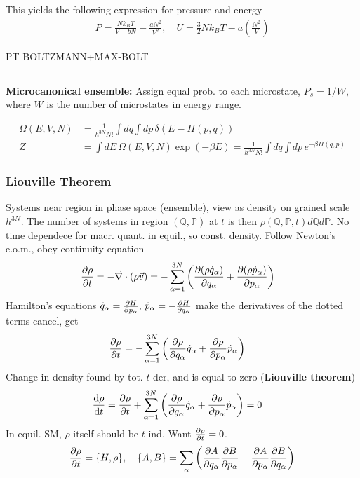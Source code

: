 \documentclass[a4paper, english, 12pt]{article}
\newcommand{\closed}[1]{\left( #1 \right)}
\newcommand{\curly}[1]{\{ #1 \} }
\newcommand{\Q}{\mathbb{Q}}
\renewcommand{\P}{\mathbb{P}}
\begin{document}
\begin{multicols*}{2}
This yields the following expression for pressure and energy 
\begin{align*}
    P = \frac{Nk_B T}{V - bN} - \frac{a N^2}{V^2},\quad U = \frac{3}{2}N k_B T - a \closed{\frac{N^2}{V}}
\end{align*}


PT 
BOLTZMANN+MAX-BOLT 

\subsection*{}

\textbf{Microcanonical ensemble:} Assign equal prob. to each microstate, $P_s=1/W$, where $W$ is the number of microstates in energy range.   

\begin{align*}
    \Omega(E,V,N) &=\frac{1}{h^{3N}N!}\int dq \int dp\, \delta(E-H(p,q)) \\
    Z &= \int dE\, \Omega(E,V,N) \exp(-\beta E) = \frac{1}{h^{3N}N!}\int dq \int dp\, e^{-\beta H(q,p)} 
\end{align*}


\subsubsection*{\scriptsize Liouville Theorem}
Systems near region in phase space (ensemble), view as density on grained scale $h^{3N}$. The number of systems in region $(\Q,\P)$ at $t$ is then $\rho(\Q,\P,t)d\Q d\P$. No time dependece for macr. quant. in equil., so const. density. Follow Newton's e.o.m., obey continuity equation 
\begin{align*}
    \pdv{\rho}{t} &= -\vec{\nabla} \cdot (\rho \vec{v}) = -\sum_{\alpha=1}^{3N}\closed{\pdv{(\rho\dot{q}_\alpha)}{q_\alpha} + \pdv{(\rho\dot{p}_\alpha)}{p_\alpha} }
\end{align*} 
Hamilton's equations $\dot{q}_\alpha=\pdv{H}{p_\alpha},\,\dot{p}_\alpha=-\pdv{H}{q_\alpha}$ make the derivatives of the dotted terms cancel, get 
\begin{align*}
    \pdv{\rho}{t} &= -\sum_{\alpha=1}^{3N} \closed{\pdv{\rho}{q_\alpha} \dot{q}_\alpha + \pdv{\rho}{p_\alpha}\dot{p}_\alpha }
\end{align*}  
Change in density found by tot. $t$-der, and is equal to zero (\textbf{Liouville theorem})
\begin{align*}
    \dv{\rho}{t} &= \pdv{\rho}{t} + \sum_{\alpha=1}^{3N} \closed{\pdv{\rho}{q_\alpha} \dot{q}_\alpha + \pdv{\rho}{p_\alpha}\dot{p}_\alpha } = 0
\end{align*}
In equil. SM, $\rho$ itself should be $t$ ind. Want $\pdv{\rho}{t}=0$.  
\begin{align*}
    \pdv{\rho}{t} = \curly{H,\rho},\quad \curly{A,B}=\sum_\alpha \closed{\pdv{A}{q_\alpha}\pdv{B}{p_\alpha} - \pdv{A}{p_\alpha}\pdv{B}{q_\alpha}} 
\end{align*}


\end{multicols*}
\end{document}
